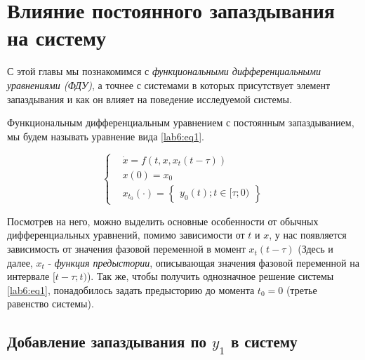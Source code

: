 %
%
\chapter{Влияние постоянного запаздывания на систему}

С этой главы мы познакомимся с \textit{функциональными дифференциальными
уравнениями (ФДУ)}, а точнее с системами в которых присутствует элемент
запаздывания и как он влияет на поведение исследуемой системы.

\begin{definition}
    Функциональным дифференциальным уравнением с постоянным запаздыванием,
    мы будем называть уравнение вида \ref{lab6:eq1}.
\end{definition}

\begin{equation}\label{lab6:eq1}
    \begin{cases}
        &\dot{x} = f(t, x, x_t(t - \tau)) \\
        &x(0) = x_0 \\
        &x_{t_0}(\cdot) = \begin{Bmatrix}y_0(t); t \in [\tau;0)\end{Bmatrix}
    \end{cases}
\end{equation}

Посмотрев на него, можно выделить основные особенности от обычных дифференциальных
уравнений, помимо зависимости от $t$ и $x$, у нас появляется зависимость от
значения фазовой переменной в момент $x_t(t-\tau)$ (Здесь и далее, $x_t$ - \textit{функция
предыстории}, описывающая значения фазовой переменной на интервале $[t-\tau;t)$).
Так же, чтобы получить однозначное решение системы \ref{lab6:eq1}, понадобилось
задать предысторию до момента $t_0 = 0$ (третье равенство системы).

\section{Добавление запаздывания по $y_1$ в систему}\label{lab6:y1}

